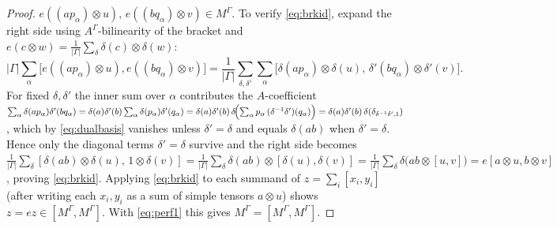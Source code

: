 \documentclass{amsart}
\theoremstyle{definition}
\newcommand{\M}{M}
\begin{document}
\begin{proof}
$e((ap_\alpha)\otimes u),\,e((bq_\alpha)\otimes v)\in\M^\Gamma$.  To
verify \eqref{eq:brkid}, expand the right side using $A^\Gamma$-bilinearity
of the bracket and $e(c\otimes w)=\frac1{|\Gamma|}\sum_{\delta}
\delta(c)\otimes\delta(w)$:
\[
|\Gamma|\sum_\alpha\bigl[e((ap_\alpha)\otimes u),e((bq_\alpha)\otimes v)\bigr]
=\frac1{|\Gamma|}\sum_{\delta,\delta'}\sum_\alpha
\bigl[\delta(ap_\alpha)\otimes\delta(u),\,
\delta'(bq_\alpha)\otimes\delta'(v)\bigr].
\]
For fixed $\delta,\delta'$ the inner sum over $\alpha$ contributes the
$A$-coefficient $\sum_\alpha\delta(ap_\alpha)\delta'(bq_\alpha)
=\delta(a)\delta'(b)\sum_\alpha\delta(p_\alpha)\delta'(q_\alpha)
=\delta(a)\delta'(b)\,\delta\!\Bigl(\sum_\alpha p_\alpha\,
(\delta^{-1}\delta')(q_\alpha)\Bigr)
=\delta(a)\delta'(b)\,\delta(\delta_{\delta^{-1}\delta',1})$, which by
\eqref{eq:dualbasis} vanishes unless $\delta'=\delta$ and equals
$\delta(ab)$ when $\delta'=\delta$.  Hence only the diagonal terms
$\delta'=\delta$ survive and the right side becomes
$\frac1{|\Gamma|}\sum_\delta[\delta(ab)\otimes\delta(u),\,1\otimes
\delta(v)]=\frac1{|\Gamma|}\sum_\delta\delta(ab)\otimes[\delta(u),\delta(v)]
=\frac1{|\Gamma|}\sum_\delta\delta\bigl(ab\otimes[u,v]\bigr)
=e[a\otimes u,b\otimes v]$, proving \eqref{eq:brkid}.  Applying
\eqref{eq:brkid} to each summand of $z=\sum_i[x_i,y_i]$ (after writing each
$x_i,y_i$ as a sum of simple tensors $a\otimes u$) shows
$z=ez\in[\M^\Gamma,\M^\Gamma]$.  With \eqref{eq:perf1} this gives
$\M^\Gamma=[\M^\Gamma,\M^\Gamma]$.
\end{proof}
\end{document}
